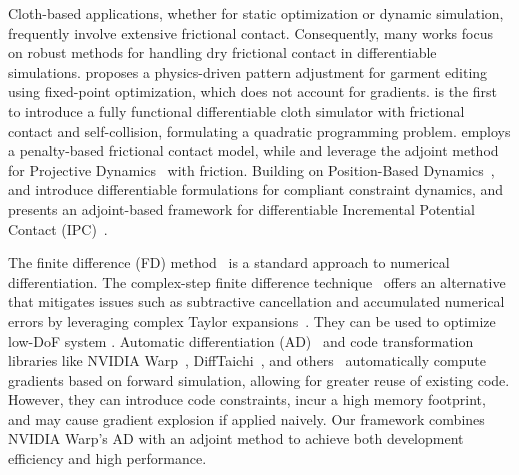 Cloth-based applications, whether for static optimization or dynamic simulation, frequently involve extensive frictional contact. Consequently, many works focus on robust methods for handling dry frictional contact in differentiable simulations. \citet{bartle2016physics} proposes a physics-driven pattern adjustment for garment editing using fixed-point optimization, which does not account for gradients. \citet{liang2019differentiable} is the first to introduce a fully functional differentiable cloth simulator with frictional contact and self-collision, formulating a quadratic programming problem. \citet{jatavallabhula2021gradsim} employs a penalty-based frictional contact model, while \citet{du2021diffpd} and \citet{li2022diffcloth} leverage the adjoint method for Projective Dynamics~\cite{bouaziz2014projective} with friction. Building on Position-Based Dynamics~\cite{muller2007position, macklin2016xpbd}, \citet{stuyck2023diffxpbd} and \citet{li2024diffavatar} introduce differentiable formulations for compliant constraint dynamics, and \citet{huang2024differentiable} presents an adjoint-based framework for differentiable Incremental Potential Contact (IPC)~\cite{li2020incremental, li2020codimensional}.


The finite difference (FD) method~\cite{renardy2006introduction} is a standard approach to numerical differentiation. The complex-step finite difference technique~\cite{luo2019accelerated, shen2021high} offers an alternative that mitigates issues such as subtractive cancellation and accumulated numerical errors by leveraging complex Taylor expansions~\cite{brezillon1981numerical}. They can be used to optimize low-DoF system \cite{zheng2025physavatar}. Automatic differentiation (AD)~\cite{naumann2011art, margossian2019review} and code transformation libraries like NVIDIA Warp~\cite{macklin2022warp}, DiffTaichi~\cite{hu2019chainqueen, hu2019difftaichi}, and others~\cite{herholz2024mesh} automatically compute gradients based on forward simulation, allowing for greater reuse of existing code. However, they can introduce code constraints, incur a high memory footprint, and may cause gradient explosion if applied naively. Our framework combines NVIDIA Warp’s AD with an adjoint method to achieve both development efficiency and high performance.
